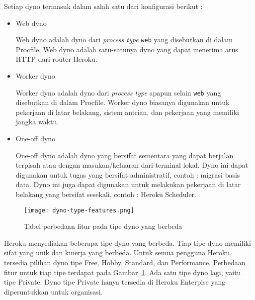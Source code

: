 Setiap dyno termasuk dalam salah satu dari konfigurasi berikut :
\begin{itemize}
\item Web dyno

Web dyno adalah dyno dari \textit{process type} \texttt{web} yang disebutkan di dalam Procfile. Web dyno adalah satu-satunya dyno yang dapat menerima arus HTTP dari router Heroku.

\item Worker dyno

Worker dyno adalah dyno dari \textit{process type} apapun selain \texttt{web} yang disebutkan di dalam Procfile. Worker dyno biasanya digunakan untuk pekerjaan di latar belakang, sistem antrian, dan pekerjaan yang memiliki jangka waktu.

\item One-off dyno

One-off dyno adalah dyno yang bersifat sementara yang dapat berjalan terpisah atau dengan masukan/keluaran dari terminal lokal. Dyno ini dapat digunakan untuk tugas yang bersifat administratif, contoh : migrasi basis data. Dyno ini juga dapat digunakan untuk melakukan pekerjaan di latar belakang yang bersifat sesekali, contoh : Heroku Scheduler.

\end{itemize} 

\begin{figure}[H]
	\centering  
	\texttt{[image: dyno-type-features.png]}  
	\caption[Tabel perbedaan fitur pada tipe dyno yang berbeda]{Tabel perbedaan fitur pada tipe dyno yang berbeda} 
	\label{fig:dyno-type-features} 
\end{figure}

Heroku menyediakan beberapa tipe dyno yang berbeda. Tiap tipe dyno memiliki sifat yang unik dan kinerja yang berbeda. Untuk semua pengguna Heroku, tersedia pilihan dyno tipe Free, Hobby, Standard, dan Performance. Perbedaan fitur untuk tiap tipe terdapat pada Gambar~\ref{fig:dyno-type-features}. Ada satu tipe dyno lagi, yaitu tipe Private. Dyno tipe Private hanya tersedia di Heroku Enterpise yang diperuntukkan untuk organisasi.

